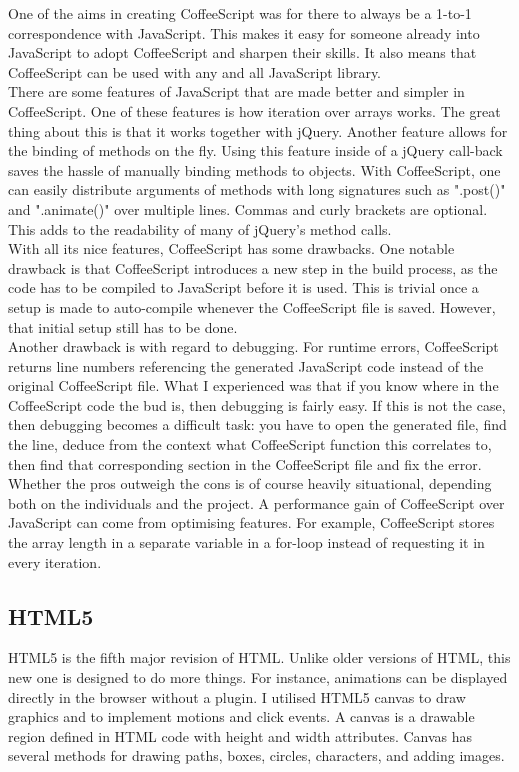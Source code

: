 \documentclass[a4paper,12pt]{article}
\begin{document}
\indent One of the aims in creating CoffeeScript was for there to always be a 1-to-1 correspondence with JavaScript. This makes it easy for someone already into JavaScript to adopt CoffeeScript and sharpen their skills. It also means that CoffeeScript can be used with any and all JavaScript library.\\

\indent There are some features of JavaScript that are made better and simpler in CoffeeScript. One of these features is how iteration over arrays works. The great thing about this is that it works together with jQuery. Another feature allows for the binding of methods on the fly. Using this feature inside of a jQuery call-back saves the hassle of manually binding methods to objects. With CoffeeScript, one can easily distribute arguments of methods with long signatures such as ".post()" and ".animate()" over multiple lines. Commas and curly brackets are optional. This adds to the readability of many of jQuery's method calls.\\

\indent With all its nice features, CoffeeScript has some drawbacks. One notable drawback is that CoffeeScript introduces a new step in the build process, as the code has to be compiled to JavaScript before it is used. This is trivial once a setup is made to auto-compile whenever the CoffeeScript file is saved. However, that initial setup still has to be done.\\

\indent Another drawback is with regard to debugging. For runtime errors, CoffeeScript returns line numbers referencing the generated JavaScript code instead of the original CoffeeScript file. What I experienced was that if you know where in the CoffeeScript code the bud is, then debugging is fairly easy. If this is not the case, then debugging becomes a difficult task: you have to open the generated file, find the line, deduce from the context what CoffeeScript function this correlates to, then find that corresponding section in the CoffeeScript file and fix the error.\\

\indent Whether the pros outweigh the cons is of course heavily situational, depending both on the individuals and the project. A performance gain of CoffeeScript over JavaScript can come from optimising features. For example, CoffeeScript stores the array length in a separate variable in a for-loop instead of requesting it in every iteration. 


\subsection{HTML5}
HTML5 is the fifth major revision of HTML. Unlike older versions of HTML, this new one is designed to do more things. For instance, animations can be displayed directly in the browser without a plugin.
I utilised HTML5 canvas to draw graphics and to implement motions and click events. A canvas is a drawable region defined in HTML code with height and width attributes. Canvas has several methods for drawing paths, boxes, circles, characters, and adding images.\\
\end{document}
